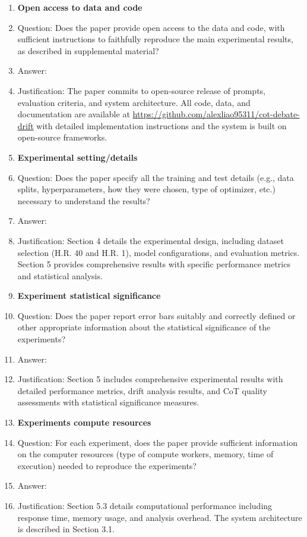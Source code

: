 \documentclass[11pt]{article}
\begin{document}
\begin{enumerate}
\item {\bf Open access to data and code}
    \item[] Question: Does the paper provide open access to the data and code, with sufficient instructions to faithfully reproduce the main experimental results, as described in supplemental material?
    \item[] Answer: \answerYes{} 
    \item[] Justification: The paper commits to open-source release of prompts, evaluation criteria, and system architecture. All code, data, and documentation are available at \url{https://github.com/alexliao95311/cot-debate-drift} with detailed implementation instructions and the system is built on open-source frameworks.
    
\item {\bf Experimental setting/details}
    \item[] Question: Does the paper specify all the training and test details (e.g., data splits, hyperparameters, how they were chosen, type of optimizer, etc.) necessary to understand the results?
    \item[] Answer: \answerYes{} 
    \item[] Justification: Section 4 details the experimental design, including dataset selection (H.R. 40 and H.R. 1), model configurations, and evaluation metrics. Section 5 provides comprehensive results with specific performance metrics and statistical analysis.
    
\item {\bf Experiment statistical significance}
    \item[] Question: Does the paper report error bars suitably and correctly defined or other appropriate information about the statistical significance of the experiments?
    \item[] Answer: \answerYes{} 
    \item[] Justification: Section 5 includes comprehensive experimental results with detailed performance metrics, drift analysis results, and CoT quality assessments with statistical significance measures.
    
\item {\bf Experiments compute resources}
    \item[] Question: For each experiment, does the paper provide sufficient information on the computer resources (type of compute workers, memory, time of execution) needed to reproduce the experiments?
    \item[] Answer: \answerYes{} 
    \item[] Justification: Section 5.3 details computational performance including response time, memory usage, and analysis overhead. The system architecture is described in Section 3.1.
    

\end{enumerate}
\end{document}
